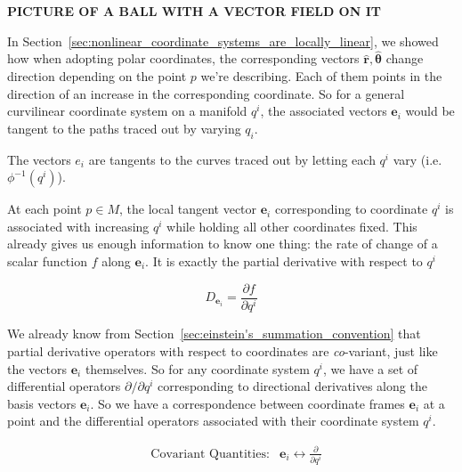 	\textbf{PICTURE OF A BALL WITH A VECTOR FIELD ON IT}
	
	In Section~\ref{sec:nonlinear_coordinate_systems_are_locally_linear}, we showed how when adopting polar coordinates, the corresponding vectors $\hat{\mathbf{r}},\hat{\mathbf{\theta}}$ change direction depending on the point $p$ we're describing. Each of them points in the direction of an increase in the corresponding coordinate. So for a general curvilinear coordinate system on a manifold $q^i$, the associated vectors $\mathbf e_i$ would be tangent to the paths traced out by varying $q_i$. 
	
	The vectors $e_i$ are tangents to the curves traced out by letting each $q^i$ vary (i.e. $\phi^{-1} (q^i)$). 
	
	At each point $p \in M$, the local tangent vector $\mathbf e_i$ corresponding to coordinate $q^i$ is associated with increasing $q^i$ while holding all other coordinates fixed. This already gives us enough information to know one thing: the rate of change of a scalar function $f$ along $\mathbf e_i$. It is exactly the partial derivative with respect to $q^i$
	
	\begin{equation}
		D_{\mathbf e_i} = \frac{\partial f}{\partial q^i}
	\end{equation}
	
	We already know from Section~\ref{sec:einstein's_summation_convention} that partial derivative operators with respect to coordinates are \emph{co}-variant, just like the vectors $\mathbf e_i$ themselves. So for any coordinate system $q^i$, we have a set of differential operators $\partial/\partial q^i$ corresponding to directional derivatives along the basis vectors $\mathbf e_i$. So we have a correspondence between coordinate frames $\mathbf e_i$ at a point and the differential operators associated with their coordinate system $q^i$.
	
	\begin{align*}
		&\text{Covariant Quantities:}&  \mathbf e_i \longleftrightarrow \frac{\partial}{\partial q^i}
	\end{align*}
	
